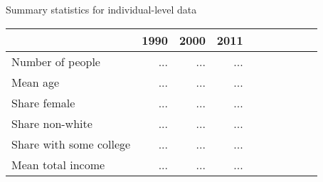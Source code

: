 \begin{center}
\begin{adjustbox}{max width=.9\textwidth}
\begin{threeparttable}[H]
\caption{Summary statistics for individual-level data}
\label{tab:table_1_empty}
\begin{tabular}{lrrrrrrrrr}
\toprule
\toprule
\textbf{}&\multicolumn{1}{c}{\textbf{1990}}&\multicolumn{1}{c}{\textbf{2000}}&\multicolumn{1}{c}{\textbf{2011}} \\
\midrule
Number of people & ... & ... & ... \\ 
Mean age  & ... & ... & ... \\ 
Share female   & ... & ... & ... \\ 
Share non-white  & ... & ... & ... \\ 
Share with some college  & ... & ... & ... \\ 
Mean total income    & ... & ... & ... \\ 
\bottomrule
\bottomrule
\end{tabular}
\end{threeparttable}
\end{adjustbox}
\end{center}
